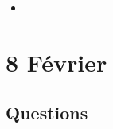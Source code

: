 \documentclass[a4paper, 11pt, hidelinks]{article}
\begin{document}
\begin{itemize}
    \item 
\end{itemize}









\section{8 Février}




\subsection{Questions}
\end{document}
